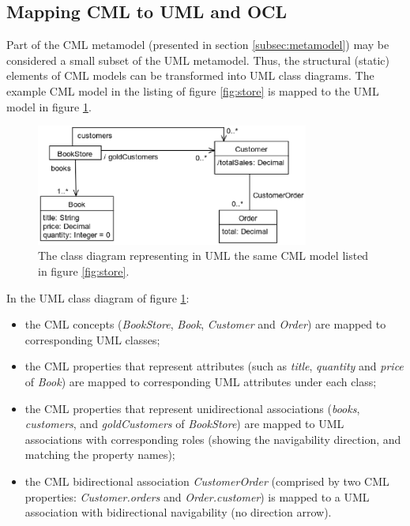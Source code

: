 \subsection{Mapping CML to UML and OCL}\label{subsec:mapping}

Part of the CML metamodel (presented in section \ref{subsec:metamodel}) may be considered a small subset of the UML  \cite{uml} metamodel.
Thus, the structural (static) elements of CML models can be transformed into UML class diagrams. The example CML model in the listing of figure \ref{fig:store} is mapped to the UML model in figure \ref{fig:uml}.

\begin{figure}
\centering
\includegraphics[width=0.8\textwidth]{language/diagram-uml}
\caption{The class diagram representing in UML  \cite{uml} the same CML model listed in figure \ref{fig:store}.}
\label{fig:uml}
\end{figure}

In the UML class diagram of figure \ref{fig:uml}:
\begin{itemize}
\item the CML concepts (\emph{BookStore}, \emph{Book}, \emph{Customer} and \emph{Order}) are mapped to corresponding UML classes;
\item the CML properties that represent attributes
(such as \emph{title}, \emph{quantity} and \emph{price} of \emph{Book})
are mapped to corresponding UML attributes under each class;
\item the CML properties that represent unidirectional associations
(\emph{books}, \emph{customers}, and \emph{goldCustomers} of \emph{BookStore})
are mapped to UML associations with corresponding roles
(showing the navigability direction, and matching the property names);
\item the CML bidirectional association \emph{CustomerOrder}
(comprised by two CML properties: \emph{Customer.orders} and \emph{Order.customer})
is mapped to a UML association with bidirectional navigability (no direction arrow).
\end{itemize}

